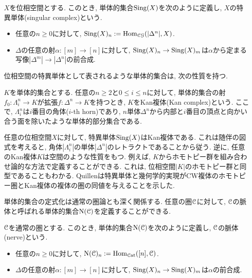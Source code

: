 \documentclass[uplatex, a4paper, 14Q, dvipdfmx]{jsreport}
\begin{document}
\begin{definition}[特異単体]
  $X$を位相空間とする.
  このとき, 単体的集合$\mathrm{Sing}(X)$を次のように定義し, $X$の特異単体(singular complex)という.
  \begin{itemize}
    \item 任意の$n \geq 0$に対して, $\mathrm{Sing}(X)_n := \mathrm{Hom}_{\mathcal{CG}}(|\Delta^n|,X)$.
    \item $\Delta$の任意の射$\alpha : [m] \to [n]$に対して, $\mathrm{Sing}(X)_n \to \mathrm{Sing}(X)_m$は$\alpha$から定まる写像$|\Delta^m| \to |\Delta^n|$の前合成. 
  \end{itemize} 
\end{definition}

位相空間の特異単体として表されるような単体的集合は, 次の性質を持つ. 

\begin{definition}[Kan複体] \label{def.1.1.2.1}
  $K$を単体的集合とする. 
  任意の$n \geq 2$と$0 \leq i \leq n$に対して, 単体的集合の射$f_0 : \Lambda^n_i \to K$が拡張$f : \Delta^n \to K$を持つとき, $K$をKan複体(Kan complex)という.
  ここで, $\Lambda^n_i$は$i$番目の角体($i$-th horn)であり, $n$単体$\Delta^n$から内部と$i$番目の頂点と向かい合う面を除いたような単体的部分集合である. 
\end{definition}

任意の位相空間$X$に対して, 特異単体$\mathrm{Sing}(X)$はKan複体である. 
これは随伴の図式を考えると, 角体$|\Lambda^n_i|$の単体$|\Delta^n|$のレトラクトであることから従う.
逆に, 任意のKan複体$K$は空間のような性質をもつ. 
例えば, $K$からホモトピー群を組み合わせ論的な方法で定義することができる. 
これは, 位相空間$|K|$のホモトピー群と同型であることもわかる.
Quillenは特異単体と幾何学的実現がCW複体のホモトピー圏とKan複体の複体の圏の同値を与えることを示した.

単体的集合の定式化は通常の圏論とも深く関係する. 
任意の圏$\mathcal{C}$に対して, $\mathcal{C}$の脈体と呼ばれる単体的集合$\mathrm{N}(\mathcal{C})$を定義することができる. 

\begin{definition}[脈体]
  $\mathcal{C}$を通常の圏とする. 
  このとき, 単体的集合$\mathrm{N}(\mathcal{C})$を次のように定義し, $\mathcal{C}$の脈体(nerve)という.
  \begin{itemize}
    \item 任意の$n \geq 0$に対して, $\mathrm{N}(\mathcal{C})_n := \mathrm{Hom}_{\mathcal{C}\mathrm{at}}([n],\mathcal{C})$.
    \item $\Delta$の任意の射$\alpha : [m] \to [n]$に対して, $\mathrm{Sing}(X)_n \to \mathrm{Sing}(X)_m$は$\alpha$の前合成. 
  \end{itemize}
\end{definition}
\end{document}
